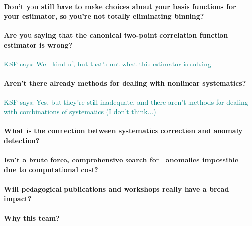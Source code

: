 \documentclass[12pt, fullpage, letterpaper]{article}
\newcommand{\KSF}[1]{\textcolor{teal}{KSF says: #1}}
\begin{document}
\paragraph{Don't you still have to make choices about your basis functions for your estimator, so you're not totally eliminating binning?}

\paragraph{Are you saying that the canonical two-point correlation function estimator is wrong?} \KSF{Well kind of, but that's not what this estimator is solving}

\paragraph{Aren't there already methods for dealing with nonlinear systematics?} \KSF{Yes, but they're still inadequate, and there aren't methods for dealing with combinations of systematics (I don't think...)}

\paragraph{What is the connection between systematics correction and anomaly detection?}

\paragraph{Isn't a brute-force, comprehensive search for \LSS\ anomalies impossible due to computational cost?}

\paragraph{Will pedagogical publications and workshops really have a broad impact?}

\paragraph{Why this team?}

\clearpage


\end{document}
